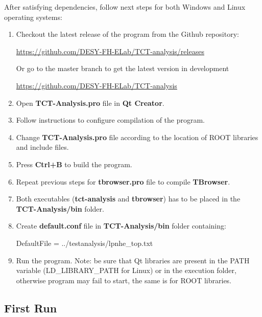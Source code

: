 \documentclass[12pt,oneside,notitlepage,abstracton,a4paper]{scrartcl}
\begin{document}
After satisfying dependencies, follow next steps for both Windows and Linux operating systems:
\begin{enumerate}
\item Checkout the latest release of the program from the Github repository:
\begin{displayquote}
\url{https://github.com/DESY-FH-ELab/TCT-analysis/releases}
\end{displayquote}
Or go to the master branch to get the latest version in development
\begin{displayquote}
\url{https://github.com/DESY-FH-ELab/TCT-analysis}
\end{displayquote}
\item Open \textbf{TCT-Analysis.pro} file in \textbf{Qt Creator}.
\item Follow instructions to configure compilation of the program.
\item Change \textbf{TCT-Analysis.pro} file according to the location of ROOT libraries and include files.
\item Press \textbf{Ctrl+B} to build the program.
\item Repeat previous steps for \textbf{tbrowser.pro} file to compile \textbf{TBrowser}.
\item Both executables (\textbf{tct-analysis} and \textbf{tbrowser}) has to be placed in the \textbf{TCT-Analysis/bin} folder. 
\item Create \textbf{default.conf} file in \textbf{TCT-Analysis/bin} folder containing:
\begin{displayquote}
DefaultFile = ../testanalysis/lpnhe\_top.txt
\end{displayquote}
\item Run the program. Note: be sure that Qt libraries are present in the PATH variable (LD\_LIBRARY\_PATH for Linux) or in the execution folder, otherwise program may fail to start, the same is for ROOT libraries.
\end{enumerate}

\subsection{First Run}\label{usage:first_run}
\end{document}
